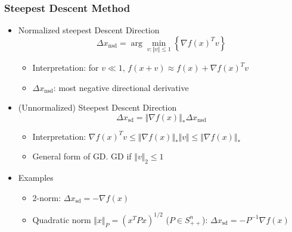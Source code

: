 \subsubsection*{Steepest Descent Method}
\begin{itemize}
    \item Normalized steepest Descent Direction
        $$ \Delta x_\mathrm{nsd}=\arg\min_{v:\Vert v\Vert\leq 1} \left\{\nabla f(x)^T v\right\} $$
    \begin{itemize}
        \item Interpretation: for $v\ll 1$, $f(x+v)\approx f(x)+\nabla f(x)^T v$
        \item $\Delta x_{\mathrm{nsd}}$: most negative directional derivative
    \end{itemize}
    \item (Unnormalized) Steepest Descent Direction
        $$ \Delta x_\mathrm{sd}=\Vert\nabla f(x)\Vert_\ast\Delta x_\mathrm{nsd} $$
    \begin{itemize}
        \item Interpretation: $\nabla f(x)^Tv\leq\Vert\nabla f(x)\Vert_\ast\Vert v\Vert\leq\Vert\nabla f(x)\Vert_\ast$
        \item General form of GD. GD if $\Vert v\Vert_2\leq 1$
    \end{itemize}
    \item Examples
    \begin{itemize}
        \item 2-norm: $\Delta x_\mathrm{sd} = -\nabla f(x)$
        \item Quadratic norm $\Vert x\Vert_P=(x^TPx)^{1/2}$ ($P\in S_{++}^n$): $\Delta x_\mathrm{sd}=-P^{-1}\nabla f(x)$
    \end{itemize}
\end{itemize}

